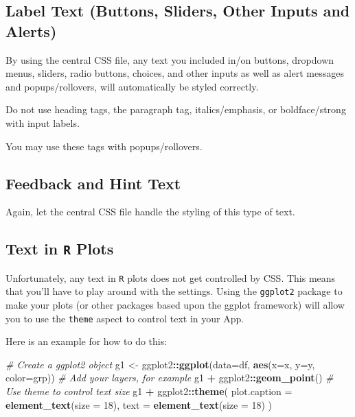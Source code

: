 \documentclass[
]{book}
\newenvironment{Shaded}{\begin{snugshade}}{\end{snugshade}}
\newcommand{\CommentTok}[1]{\textcolor[rgb]{0.56,0.35,0.01}{\textit{#1}}}
\newcommand{\DataTypeTok}[1]{\textcolor[rgb]{0.13,0.29,0.53}{#1}}
\newcommand{\DecValTok}[1]{\textcolor[rgb]{0.00,0.00,0.81}{#1}}
\newcommand{\KeywordTok}[1]{\textcolor[rgb]{0.13,0.29,0.53}{\textbf{#1}}}
\newcommand{\NormalTok}[1]{#1}
\newcommand{\OperatorTok}[1]{\textcolor[rgb]{0.81,0.36,0.00}{\textbf{#1}}}
\newcommand{\StringTok}[1]{\textcolor[rgb]{0.31,0.60,0.02}{#1}}
\begin{document}
\hypertarget{label-text-buttons-sliders-other-inputs-and-alerts}{%
\subsection{Label Text (Buttons, Sliders, Other Inputs and Alerts)}\label{label-text-buttons-sliders-other-inputs-and-alerts}}

By using the central CSS file, any text you included in/on buttons, dropdown menus, sliders, radio buttons, choices, and other inputs as well as alert messages and popups/rollovers, will automatically be styled correctly.

Do not use heading tags, the paragraph tag, italics/emphasis, or boldface/strong with input labels.

You may use these tags with popups/rollovers.

\hypertarget{feedback-and-hint-text}{%
\subsection{Feedback and Hint Text}\label{feedback-and-hint-text}}

Again, let the central CSS file handle the styling of this type of text.

\hypertarget{text-in-r-plots}{%
\subsection{\texorpdfstring{Text in \texttt{R} Plots}{Text in R Plots}}\label{text-in-r-plots}}

Unfortunately, any text in \texttt{R} plots does not get controlled by CSS. This means that you'll have to play around with the settings. Using the \texttt{ggplot2} package to make your plots (or other packages based upon the ggplot framework) will allow you to use the \texttt{theme} aspect to control text in your App.

Here is an example for how to do this:

\begin{Shaded}
\begin{Highlighting}[]
\CommentTok{# Create a ggplot2 object}
\NormalTok{g1 <-}\StringTok{ }\NormalTok{ggplot2}\OperatorTok{::}\KeywordTok{ggplot}\NormalTok{(}\DataTypeTok{data=}\NormalTok{df, }\KeywordTok{aes}\NormalTok{(}\DataTypeTok{x=}\NormalTok{x, }\DataTypeTok{y=}\NormalTok{y, }\DataTypeTok{color=}\NormalTok{grp)) }
\CommentTok{# Add your layers, for example}
\NormalTok{g1 }\OperatorTok{+}\StringTok{ }\NormalTok{ggplot2}\OperatorTok{::}\KeywordTok{geom_point}\NormalTok{()}
\CommentTok{# Use theme to control text size}
\NormalTok{g1 }\OperatorTok{+}\StringTok{ }\NormalTok{ggplot2}\OperatorTok{::}\KeywordTok{theme}\NormalTok{(}
  \DataTypeTok{plot.caption =} \KeywordTok{element_text}\NormalTok{(}\DataTypeTok{size =} \DecValTok{18}\NormalTok{),}
  \DataTypeTok{text =} \KeywordTok{element_text}\NormalTok{(}\DataTypeTok{size =} \DecValTok{18}\NormalTok{)}
\NormalTok{  )}
\end{Highlighting}
\end{Shaded}
\end{document}
